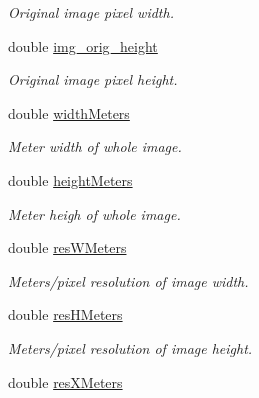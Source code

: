 \begin{DoxyCompactItemize}
\begin{DoxyCompactList}\small\item\em Original image pixel width. \end{DoxyCompactList}\item 
\hypertarget{class_geomap3_d_aeacbb547df7e4aa7e92a42f8de4734da}{
double \hyperlink{class_geomap3_d_aeacbb547df7e4aa7e92a42f8de4734da}{img\_\-orig\_\-height}}
\label{class_geomap3_d_aeacbb547df7e4aa7e92a42f8de4734da}

\begin{DoxyCompactList}\small\item\em Original image pixel height. \end{DoxyCompactList}\item 
\hypertarget{class_geomap3_d_aa619dfa660478df744ee6758287b639c}{
double \hyperlink{class_geomap3_d_aa619dfa660478df744ee6758287b639c}{widthMeters}}
\label{class_geomap3_d_aa619dfa660478df744ee6758287b639c}

\begin{DoxyCompactList}\small\item\em Meter width of whole image. \end{DoxyCompactList}\item 
\hypertarget{class_geomap3_d_af8759a9593146cd8550d654f3a1fe1e1}{
double \hyperlink{class_geomap3_d_af8759a9593146cd8550d654f3a1fe1e1}{heightMeters}}
\label{class_geomap3_d_af8759a9593146cd8550d654f3a1fe1e1}

\begin{DoxyCompactList}\small\item\em Meter heigh of whole image. \end{DoxyCompactList}\item 
\hypertarget{class_geomap3_d_a1b43e2841f214afdb29fd39589b3da9a}{
double \hyperlink{class_geomap3_d_a1b43e2841f214afdb29fd39589b3da9a}{resWMeters}}
\label{class_geomap3_d_a1b43e2841f214afdb29fd39589b3da9a}

\begin{DoxyCompactList}\small\item\em Meters/pixel resolution of image width. \end{DoxyCompactList}\item 
\hypertarget{class_geomap3_d_a183f6500c71d309d365883fe68a278b1}{
double \hyperlink{class_geomap3_d_a183f6500c71d309d365883fe68a278b1}{resHMeters}}
\label{class_geomap3_d_a183f6500c71d309d365883fe68a278b1}

\begin{DoxyCompactList}\small\item\em Meters/pixel resolution of image height. \end{DoxyCompactList}\item 
\hypertarget{class_geomap3_d_a0a7a08affb1044647626df0afe0f2f6d}{
double \hyperlink{class_geomap3_d_a0a7a08affb1044647626df0afe0f2f6d}{resXMeters}}
\label{class_geomap3_d_a0a7a08affb1044647626df0afe0f2f6d}


\end{DoxyCompactItemize}
